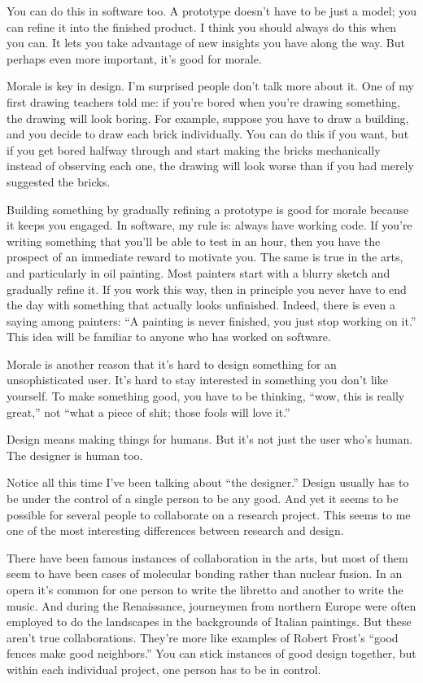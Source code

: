 \documentclass[12pt]{book}
\begin{document}
You can do this in software too. A prototype doesn't have to be just a
model; you can refine it into the finished product. I think you should
always do this when you can. It lets you take advantage of new insights
you have along the way. But perhaps even more important, it's good for
morale.

Morale is key in design. I'm surprised people don't talk more about it.
One of my first drawing teachers told me: if you're bored when you're
drawing something, the drawing will look boring. For example, suppose
you have to draw a building, and you decide to draw each brick
individually. You can do this if you want, but if you get bored halfway
through and start making the bricks mechanically instead of observing
each one, the drawing will look worse than if you had merely suggested
the bricks.

Building something by gradually refining a prototype is good for morale
because it keeps you engaged. In software, my rule is: always have
working code. If you're writing something that you'll be able to test in
an hour, then you have the prospect of an immediate reward to motivate
you. The same is true in the arts, and particularly in oil painting.
Most painters start with a blurry sketch and gradually refine it. If you
work this way, then in principle you never have to end the day with
something that actually looks unfinished. Indeed, there is even a saying
among painters: ``A painting is never finished, you just stop working on
it.'' This idea will be familiar to anyone who has worked on software.

Morale is another reason that it's hard to design something for an
unsophisticated user. It's hard to stay interested in something you
don't like yourself. To make something good, you have to be thinking,
``wow, this is really great,'' not ``what a piece of shit; those fools
will love it.''

Design means making things for humans. But it's not just the user who's
human. The designer is human too.

Notice all this time I've been talking about ``the designer.'' Design
usually has to be under the control of a single person to be any good.
And yet it seems to be possible for several people to collaborate on a
research project. This seems to me one of the most interesting
differences between research and design.

There have been famous instances of collaboration in the arts, but most
of them seem to have been cases of molecular bonding rather than nuclear
fusion. In an opera it's common for one person to write the libretto and
another to write the music. And during the Renaissance, journeymen from
northern Europe were often employed to do the landscapes in the
backgrounds of Italian paintings. But these aren't true collaborations.
They're more like examples of Robert Frost's ``good fences make good
neighbors.'' You can stick instances of good design together, but within
each individual project, one person has to be in control.
\end{document}
